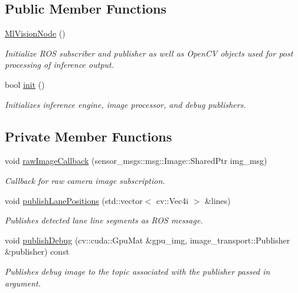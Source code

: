\subsection*{Public Member Functions}
\begin{DoxyCompactItemize}
\item 
\mbox{\label{classMlVisionNode_a1a07ccd1830082c3e28ff97f95819618}} 
\hyperlink{classMlVisionNode_a1a07ccd1830082c3e28ff97f95819618}{Ml\+Vision\+Node} ()
\begin{DoxyCompactList}\small\item\em Initialize R\+OS subscriber and publisher as well as Open\+CV objects used for post processing of inference output. \end{DoxyCompactList}\item 
bool \hyperlink{classMlVisionNode_aadb64eb869ae730fa6766f95d3c352a2}{init} ()
\begin{DoxyCompactList}\small\item\em Initializes inference engine, image processor, and debug publishers. \end{DoxyCompactList}\end{DoxyCompactItemize}
\subsection*{Private Member Functions}
\begin{DoxyCompactItemize}
\item 
void \hyperlink{classMlVisionNode_a1926f7a99c102f89f739240ecd44f6e7}{raw\+Image\+Callback} (sensor\+\_\+msgs\+::msg\+::\+Image\+::\+Shared\+Ptr img\+\_\+msg)
\begin{DoxyCompactList}\small\item\em Callback for raw camera image subscription. \end{DoxyCompactList}\item 
void \hyperlink{classMlVisionNode_a508766f7ec927847d5ce80abd9740c7c}{publish\+Lane\+Positions} (std\+::vector$<$ cv\+::\+Vec4i $>$ \&lines)
\begin{DoxyCompactList}\small\item\em Publishes detected lane line segments as R\+OS message. \end{DoxyCompactList}\item 
void \hyperlink{classMlVisionNode_a56422aa2b6f2843226bdeff85ebe785f}{publish\+Debug} (cv\+::cuda\+::\+Gpu\+Mat \&gpu\+\_\+img, image\+\_\+transport\+::\+Publisher \&publisher) const
\begin{DoxyCompactList}\small\item\em Publishes debug image to the topic associated with the publisher passed in argument. \end{DoxyCompactList}\end{DoxyCompactItemize}
